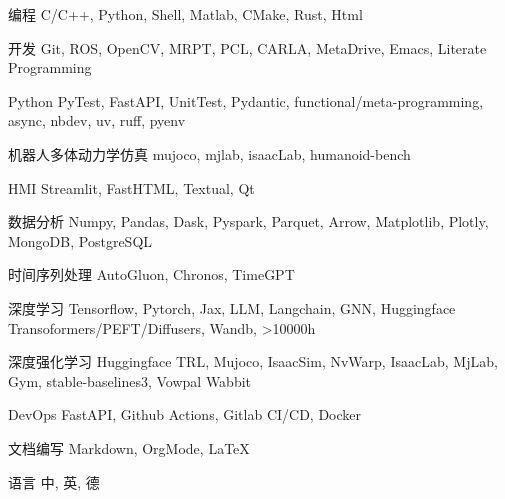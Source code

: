 \documentclass[../cv_cn.tex]{subfiles}
\begin{document}


\begin{cvskills}

  \cvskill
    {编程} %
    {C/C++, Python, Shell, Matlab, CMake, Rust, Html} %

  \cvskill
    {开发} %
    {Git, ROS, OpenCV, MRPT, PCL, CARLA, MetaDrive, Emacs, Literate Programming} %

  \cvskill
    {Python} %
    {PyTest, FastAPI, UnitTest, Pydantic, functional/meta-programming, async, nbdev, uv, ruff, pyenv} %

  \cvskill
    {机器人多体动力学仿真} %
    {mujoco, mjlab, isaacLab, humanoid-bench} %

  \cvskill
    {HMI} %
    {Streamlit, FastHTML, Textual, Qt} %

  \cvskill
    {数据分析} %
    {Numpy, Pandas, Dask, Pyspark, Parquet, Arrow, Matplotlib, Plotly, MongoDB, PostgreSQL} %

  \cvskill
    {时间序列处理} %
    {AutoGluon, Chronos, TimeGPT} %

  \cvskill
    {深度学习} %
    {Tensorflow, Pytorch, Jax, LLM, Langchain, GNN, Huggingface Transoformers/PEFT/Diffusers, Wandb, >10000h} %

  \cvskill
    {深度强化学习} %
    {Huggingface TRL, Mujoco, IsaacSim, NvWarp, IsaacLab, MjLab, Gym, stable-baselines3, Vowpal Wabbit} %


  \cvskill
    {DevOps} %
    {FastAPI, Github Actions, Gitlab CI/CD, Docker} %

  \cvskill
    {文档编写} %
    {Markdown, OrgMode, LaTeX} %

  \cvskill
    {语言} %
    {中, 英, 德} %

\end{cvskills}
\end{document}
